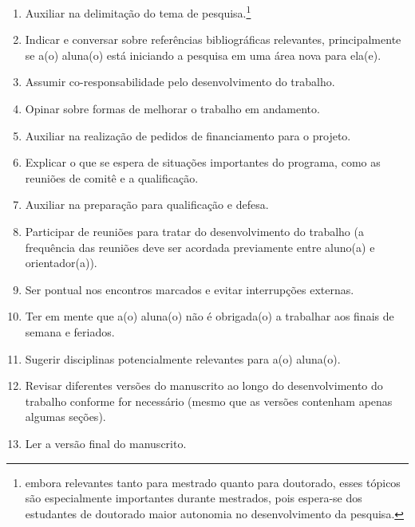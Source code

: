 \documentclass[twoside a4paper 12pt]{report}
\begin{document}
\begin{enumerate}
\item Auxiliar na delimitação do tema de pesquisa.\footnote{embora relevantes tanto para mestrado quanto para doutorado, esses tópicos são especialmente importantes durante mestrados, pois espera-se dos estudantes de doutorado maior autonomia no desenvolvimento da pesquisa.\label{fn:om1}}
\item Indicar e conversar sobre referências bibliográficas relevantes,
  principalmente se a(o) aluna(o) está iniciando a pesquisa em uma
  área nova para ela(e).
\item Assumir co-responsabilidade pelo desenvolvimento do
  trabalho.
\item Opinar sobre formas de melhorar o trabalho em
  andamento.
\item Auxiliar na realização de pedidos de financiamento para o
  projeto.
\item Explicar o que se espera de situações importantes do programa,
  como as reuniões de comitê e a qualificação.
\item Auxiliar na preparação para qualificação e defesa.
\item Participar de reuniões para tratar do desenvolvimento do
  trabalho (a frequência das reuniões deve ser acordada previamente
  entre aluno(a) e orientador(a)).
\item Ser pontual nos encontros marcados e evitar interrupções externas.
\item Ter em mente que a(o) aluna(o) não é obrigada(o) a trabalhar aos
  finais de semana e feriados.
\item Sugerir disciplinas potencialmente relevantes para a(o) aluna(o). 
\item Revisar diferentes versões do manuscrito ao longo do
  desenvolvimento do trabalho conforme for necessário (mesmo que as
  versões contenham apenas algumas seções).
\item Ler a versão final do manuscrito.
\end{enumerate}
\end{document}

